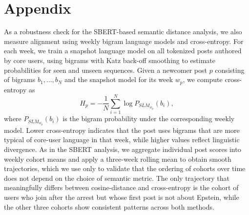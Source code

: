 \documentclass[letterpaper]{article} %
\begin{document}
\appendix
\section{Appendix}
As a robustness check for the SBERT-based semantic distance analysis, we also measure alignment using weekly bigram language models and cross-entropy. 
For each week, we train a snapshot language model on all tokenized posts authored by core users, using bigrams with Katz back-off smoothing to estimate probabilities for seen and unseen sequences. 
Given a newcomer post \(p\) consisting of bigrams \(b_1, \ldots, b_N\) and the snapshot model for its week \(w_p\), we compute cross-entropy as
\begin{equation}
    H_p = - \frac{1}{N} \sum_{i=1}^{N} \log P_{SLM_{w_p}}(b_i),
\end{equation}
where \(P_{SLM_{w_p}}(b_i)\) is the bigram probability under the corresponding weekly model. 
Lower cross-entropy indicates that the post uses bigrams that are more typical of core-user language in that week, while higher values reflect linguistic divergence. 
As in the SBERT analysis, we aggregate individual post scores into weekly cohort means and apply a three-week rolling mean to obtain smooth trajectories, which we use only to validate that the ordering of cohorts over time does not depend on the choice of semantic metric. 
The only trajectory that meaningfully differs between cosine-distance and cross-entropy is the cohort of users who join after the arrest but whose first post is not about Epstein, while the other three cohorts show consistent patterns across both methods.
\end{document}
